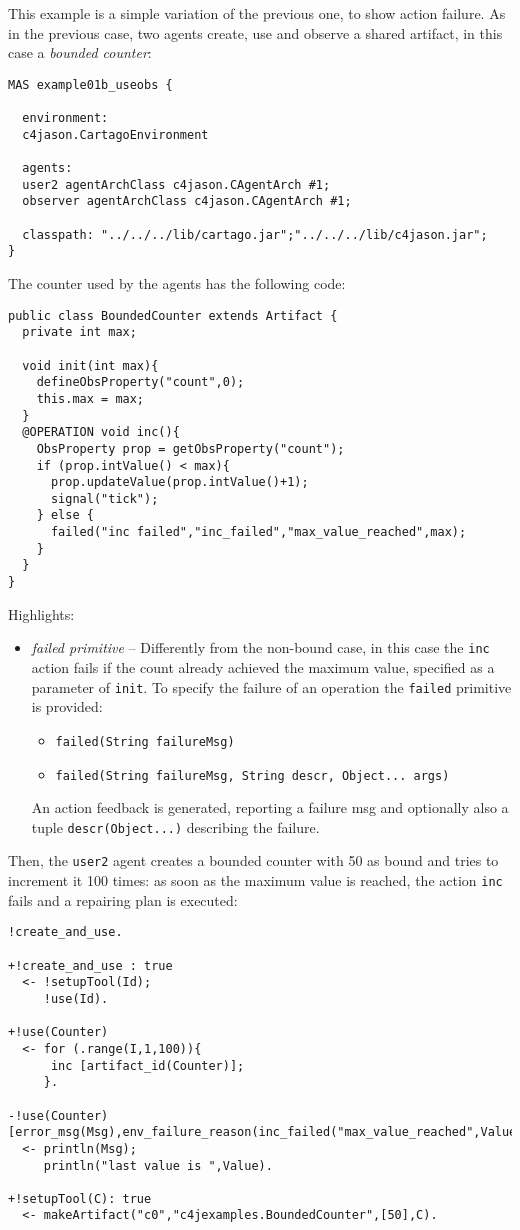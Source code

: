 \documentclass[11pt]{report}
\newcommand\code[1]{{\small{\mbox{\texttt{{#1}}}}}}
\begin{document}
This example is a simple variation of the previous one, to show action failure.
%
As in the previous case, two agents create, use and observe a shared artifact, in this case a \emph{bounded counter}:
%
{\small{
\begin{verbatim}
MAS example01b_useobs {

  environment: 
  c4jason.CartagoEnvironment

  agents:  
  user2 agentArchClass c4jason.CAgentArch #1;
  observer agentArchClass c4jason.CAgentArch #1;

  classpath: "../../../lib/cartago.jar";"../../../lib/c4jason.jar";    
}
\end{verbatim}}}
%
\noindent The counter used by the agents has the following code:
%
{\small{
\begin{verbatim}
public class BoundedCounter extends Artifact {
  private int max;
	
  void init(int max){
    defineObsProperty("count",0);
    this.max = max;
  }	    
  @OPERATION void inc(){
    ObsProperty prop = getObsProperty("count");
    if (prop.intValue() < max){
      prop.updateValue(prop.intValue()+1);
      signal("tick");
    } else {
      failed("inc failed","inc_failed","max_value_reached",max);
    }
  }
}
\end{verbatim}}}
%
\noindent Highlights:
\begin{itemize}
\item \emph{failed primitive} -- Differently from the non-bound case, in this case the \code{inc} action fails if the count already achieved the maximum value, specified as a parameter of \code{init}.
%
To specify the failure of an operation the \code{failed} primitive is provided:
\begin{itemize}
\item \code{failed(String failureMsg)}
\item \code{failed(String failureMsg, String descr, Object... args)}
\end{itemize} 
%
\noindent An action feedback is generated, reporting a failure msg and optionally also a tuple \code{descr(Object...)} describing the failure.
%
\end{itemize}
%
\noindent Then, the \code{user2} agent creates a bounded counter with 50 as bound and tries to increment it 100 times: as soon as the maximum value is reached, the action \code{inc} fails and a repairing plan is executed:
%
{\small{
\begin{verbatim}
!create_and_use.

+!create_and_use : true
  <- !setupTool(Id);
     !use(Id).
     
+!use(Counter)
  <- for (.range(I,1,100)){
      inc [artifact_id(Counter)];
     }.
     
-!use(Counter) [error_msg(Msg),env_failure_reason(inc_failed("max_value_reached",Value))]  
  <- println(Msg);
     println("last value is ",Value).

+!setupTool(C): true 
  <- makeArtifact("c0","c4jexamples.BoundedCounter",[50],C).
\end{verbatim}}}
\end{document}
